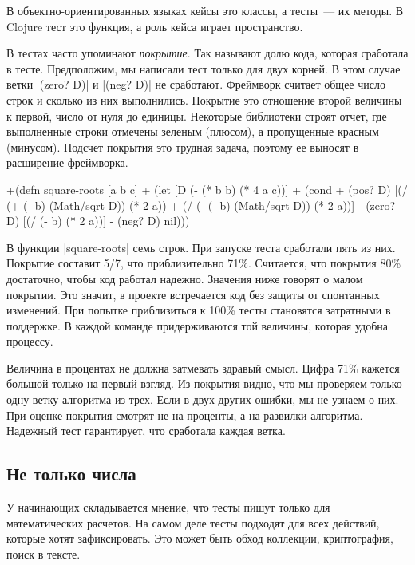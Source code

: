 В объектно-ориентированных языках кейсы это классы, а тесты~--- их методы. В
Clojure тест это функция, а роль кейса играет пространство.

В тестах часто упоминают \emph{покрытие}. Так называют долю кода, которая
сработала в тесте. Предположим, мы написали тест только для двух корней. В этом
случае ветки \spverb|(zero? D)| и \spverb|(neg? D)| не сработают. Фреймворк
считает общее число строк и сколько из них выполнились. Покрытие это отношение
второй величины к первой, число от нуля до единицы. Некоторые библиотеки строят
отчет, где выполненные строки отмечены зеленым (плюсом), а пропущенные красным
(минусом). Подсчет покрытия это трудная задача, поэтому ее выносят в расширение
фреймворка.

\begin{english}
  \begin{diff}
+(defn square-roots [a b c]
+  (let [D (- (* b b) (* 4 a c))]
+    (cond
+      (pos? D) [(/ (+ (- b) (Math/sqrt D)) (* 2 a))
+                (/ (- (- b) (Math/sqrt D)) (* 2 a))]
-      (zero? D) [(/ (- b) (* 2 a))]
-      (neg? D) nil)))
  \end{diff}
\end{english}

В функции \spverb|square-roots| семь строк. При запуске теста сработали пять из
них. Покрытие составит 5/7, что приблизительно 71\%. Считается, что покрытия
80\% достаточно, чтобы код работал надежно. Значения ниже говорят о малом
покрытии. Это значит, в проекте встречается код без защиты от спонтанных
изменений. При попытке приблизиться к 100\% тесты становятся затратными в
поддержке. В каждой команде придерживаются той величины, которая удобна
процессу.

Величина в процентах не должна затмевать здравый смысл. Цифра 71\% кажется
большой только на первый взгляд. Из покрытия видно, что мы проверяем только одну
ветку алгоритма из трех. Если в двух других ошибки, мы не узнаем о них. При
оценке покрытия смотрят не на проценты, а на развилки алгоритма. Надежный тест
гарантирует, что сработала каждая ветка.

\subsection{Не только числа}

У начинающих складывается мнение, что тесты пишут только для математических
расчетов. На самом деле тесты подходят для всех действий, которые хотят
зафиксировать. Это может быть обход коллекции, криптография, поиск в тексте.

